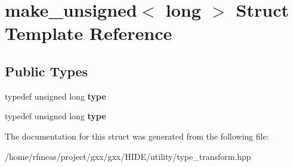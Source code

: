 \hypertarget{structmake__unsigned_3_01long_01_4}{}\section{make\+\_\+unsigned$<$ long $>$ Struct Template Reference}
\label{structmake__unsigned_3_01long_01_4}
\subsection*{Public Types}
\begin{DoxyCompactItemize}
\item 
typedef unsigned long {\bfseries type}\hypertarget{structmake__unsigned_3_01long_01_4_a0aec5f3b0ae86063f4951ec82e421ca3}{}\label{structmake__unsigned_3_01long_01_4_a0aec5f3b0ae86063f4951ec82e421ca3}

\item 
typedef unsigned long {\bfseries type}\hypertarget{structmake__unsigned_3_01long_01_4_a0aec5f3b0ae86063f4951ec82e421ca3}{}\label{structmake__unsigned_3_01long_01_4_a0aec5f3b0ae86063f4951ec82e421ca3}

\end{DoxyCompactItemize}


The documentation for this struct was generated from the following file\+:\begin{DoxyCompactItemize}
\item 
/home/rfmeas/project/gxx/gxx/\+H\+I\+D\+E/utility/type\+\_\+transform.\+hpp\end{DoxyCompactItemize}
